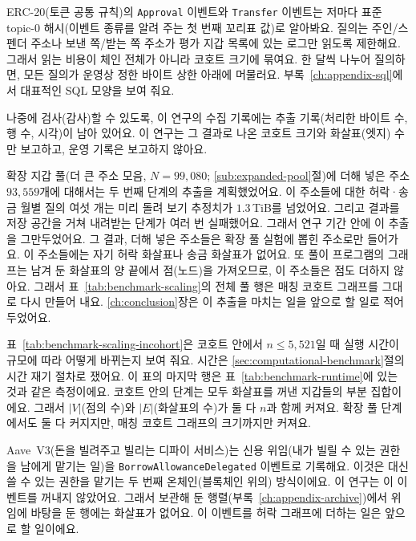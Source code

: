 ERC-20(토큰 공통 규칙)의 \texttt{Approval} 이벤트와 \texttt{Transfer} 이벤트는 저마다 표준 topic-$0$ 해시(이벤트 종류를 알려 주는 첫 번째 꼬리표 값)로 알아봐요. 질의는 주인/스펜더 주소나 보낸 쪽/받는 쪽 주소가 평가 지갑 목록에 있는 로그만 읽도록 제한해요. 그래서 읽는 비용이 체인 전체가 아니라 코호트 크기에 묶여요. 한 달씩 나누어 질의하면, 모든 질의가 운영상 정한 바이트 상한 아래에 머물러요. 부록~\ref{ch:appendix-sql}에서 대표적인 SQL 모양을 보여 줘요.

나중에 검사(감사)할 수 있도록, 이 연구의 수집 기록에는 추출 기록(처리한 바이트 수, 행 수, 시각)이 남아 있어요. 이 연구는 그 결과로 나온 코호트 크기와 화살표(엣지) 수만 보고하고, 운영 기록은 보고하지 않아요.

확장 지갑 풀(더 큰 주소 모음, $N=99{,}080$; \ref{sub:expanded-pool}절)에 더해 넣은 주소 $93{,}559$개에 대해서는 두 번째 단계의 추출을 계획했었어요. 이 주소들에 대한 허락·송금 월별 질의 여섯 개는 미리 돌려 보기 추정치가 $1.3$\,TiB를 넘었어요. 그리고 결과를 저장 공간을 거쳐 내려받는 단계가 여러 번 실패했어요. 그래서 연구 기간 안에 이 추출을 그만두었어요. 그 결과, 더해 넣은 주소들은 확장 풀 실험에 뽑힌 주소로만 들어가요. 이 주소들에는 자기 허락 화살표나 송금 화살표가 없어요. 또 풀이 프로그램의 그래프는 남겨 둔 화살표의 양 끝에서 점(노드)을 가져오므로, 이 주소들은 점도 더하지 않아요. 그래서 표~\ref{tab:benchmark-scaling}의 전체 풀 행은 매칭 코호트 그래프를 그대로 다시 만들어 내요. \ref{ch:conclusion}장은 이 추출을 마치는 일을 앞으로 할 일로 적어 두었어요.


표~\ref{tab:benchmark-scaling-incohort}은 코호트 안에서 $n \leq 5{,}521$일 때 실행 시간이 규모에 따라 어떻게 바뀌는지 보여 줘요. 시간은 \ref{sec:computational-benchmark}절의 시간 재기 절차로 쟀어요. 이 표의 마지막 행은 표~\ref{tab:benchmark-runtime}에 있는 것과 같은 측정이에요. 코호트 안의 단계는 모두 화살표를 꺼낸 지갑들의 부분 집합이에요. 그래서 $|V|$(점의 수)와 $|E|$(화살표의 수)가 둘 다 $n$과 함께 커져요. 확장 풀 단계에서도 둘 다 커지지만, 매칭 코호트 그래프의 크기까지만 커져요.




Aave~V3(돈을 빌려주고 빌리는 디파이 서비스)는 신용 위임(내가 빌릴 수 있는 권한을 남에게 맡기는 일)을 \texttt{BorrowAllowanceDelegated} 이벤트로 기록해요. 이것은 대신 쓸 수 있는 권한을 맡기는 두 번째 온체인(블록체인 위의) 방식이에요. 이 연구는 이 이벤트를 꺼내지 않았어요. 그래서 보관해 둔 행렬(부록~\ref{ch:appendix-archive})에서 위임에 바탕을 둔 행에는 화살표가 없어요. 이 이벤트를 허락 그래프에 더하는 일은 앞으로 할 일이에요.

